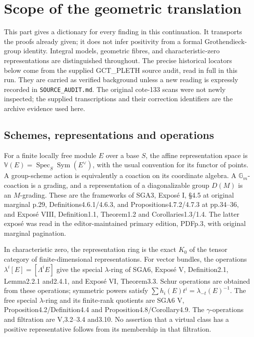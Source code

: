 \section{Scope of the geometric translation}

This part gives a dictionary for every finding in this continuation.
It transports the proofs already given; it does not infer positivity
from a formal Grothendieck-group identity.  Integral models, geometric
fibres, and characteristic-zero representations are distinguished
throughout.  The precise historical locators below come from the
supplied GCT\_PLETH source audit, read in full in this run.  They are
carried as verified background unless a new reading is expressly
recorded in \texttt{SOURCE\_AUDIT.md}.  The original cote-133 scans
were not newly inspected; the supplied transcriptions and their
correction identifiers are the archive evidence used here.

\subsection{Schemes, representations and operations}
For a finite locally free module $E$ over a base $S$, the affine
representation space is
$\mathbb V(E)=\operatorname{Spec}_S\operatorname{Sym}(E^\vee)$,
with the usual convention for its functor of points.  A group-scheme
action is equivalently a coaction on its coordinate algebra.  A
$\mathbb G_m$-coaction is a grading, and a representation of a
diagonalizable group $D(M)$ is an $M$-grading.  These are the
frameworks of SGA3, Expos\'e I, \S4.5 at original marginal p.29,
Definitions4.6.1/4.6.3, and Propositions4.7.2/4.7.3
at pp.34--36, and Expos\'e VIII,
Definition1.1, Theorem1.2 and Corollaries1.3/1.4.  The latter
expos\'e was read in the editor-maintained primary edition, PDFp.3,
with original marginal pagination.

In characteristic zero, the representation ring is the exact
$K_0$ of the tensor category of finite-dimensional representations.
For vector bundles, the operations
$\lambda^i[E]=[\Lambda^iE]$ give the special $\lambda$-ring of
SGA6, Expos\'e V, Definition2.1, Lemma2.2.1 and2.4.1, and
Expos\'e VI, Theorem3.3.  Schur operations are obtained from these
operations; symmetric powers satisfy
$\sum h_i(E)t^i=\lambda_{-t}(E)^{-1}$.
The free special $\lambda$-ring and its finite-rank quotients are
SGA6 V, Proposition4.2/Definition4.4 and Proposition4.8/Corollary4.9.
The $\gamma$-operations and filtration are V,3.2--3.4 and3.10.
No assertion that a virtual class has a positive representative
follows from its membership in that filtration.

